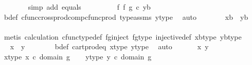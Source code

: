 \begin{isabellebody}
\ \ \ \ \ \ \isamarkupfalse%
\ {\isacharparenleft}{\kern0pt}simp\ add{\isacharcolon}{\kern0pt}\ equals{\isacharparenright}{\kern0pt}\isanewline
\ \ \ \ \isamarkupfalse%
\ \isamarkupfalse%
\ {\isachardoublequoteopen}{\isachardot}{\kern0pt}{\isachardot}{\kern0pt}{\isachardot}{\kern0pt}\ {\isacharequal}{\kern0pt}\ {\isacharparenleft}{\kern0pt}f\ {\isasymtimes}\isactrlsub f\ g{\isacharparenright}{\kern0pt}\ {\isasymcirc}\isactrlsub c\ {\isasymlangle}y{\isacharcomma}{\kern0pt}b{\isasymrangle}{\isachardoublequoteclose}\isanewline
\ \ \ \ \ \ \isamarkupfalse%
\ b{\isacharunderscore}{\kern0pt}def\ cfunc{\isacharunderscore}{\kern0pt}cross{\isacharunderscore}{\kern0pt}prod{\isacharunderscore}{\kern0pt}comp{\isacharunderscore}{\kern0pt}cfunc{\isacharunderscore}{\kern0pt}prod\ type{\isacharunderscore}{\kern0pt}assms\ y{\isacharunderscore}{\kern0pt}type{}\ \isamarkupfalse%
\ auto\isanewline
\ \ \ \ \isamarkupfalse%
\ \isamarkupfalse%
\ {\isachardoublequoteopen}{\isasymlangle}x{\isacharcomma}{\kern0pt}b{\isasymrangle}\ {\isacharequal}{\kern0pt}\ {\isasymlangle}y{\isacharcomma}{\kern0pt}b{\isasymrangle}{\isachardoublequoteclose}\isanewline
\ \ \ \ \ \ \isamarkupfalse%
\ {\isacharparenleft}{\kern0pt}metis\ calculation\ cfunc{\isacharunderscore}{\kern0pt}type{\isacharunderscore}{\kern0pt}def\ fg{\isacharunderscore}{\kern0pt}inject\ fg{\isacharunderscore}{\kern0pt}type\ injective{\isacharunderscore}{\kern0pt}def\ xb{\isacharunderscore}{\kern0pt}type\ yb{\isacharunderscore}{\kern0pt}type{\isacharparenright}{\kern0pt}\isanewline
\ \ \ \ \isamarkupfalse%
\ \isamarkupfalse%
\ {\isachardoublequoteopen}x\ {\isacharequal}{\kern0pt}\ y{\isachardoublequoteclose}\isanewline
\ \ \ \ \ \ \isamarkupfalse%
\ b{\isacharunderscore}{\kern0pt}def\ cart{\isacharunderscore}{\kern0pt}prod{\isacharunderscore}{\kern0pt}eq{}\ x{\isacharunderscore}{\kern0pt}type{}\ y{\isacharunderscore}{\kern0pt}type{}\ \isamarkupfalse%
\ auto\isanewline
\ \ \isamarkupfalse%
\isanewline
{}\isamarkupfalse%
\isanewline
\ \ \isamarkupfalse%
\ x\ y\ \isanewline
\ \ \isamarkupfalse%
\ x{\isacharunderscore}{\kern0pt}type{\isacharcolon}{\kern0pt}\ {\isachardoublequoteopen}x\ {\isasymin}\isactrlsub c\ domain\ g{\isachardoublequoteclose}\isanewline
\ \ \isamarkupfalse%
\ y{\isacharunderscore}{\kern0pt}type{\isacharcolon}{\kern0pt}\ {\isachardoublequoteopen}y\ {\isasymin}\isactrlsub c\ domain\ g{\isachardoublequoteclose}\isanewline

\end{isabellebody}
